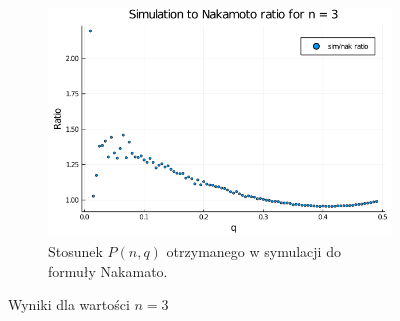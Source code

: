 \documentclass{article}
\begin{document}
\begin{figure}[H]
            \begin{subfigure}{0.65\textwidth}
                \includegraphics[width=\linewidth]{img/mc_to_na_n=3.png}
                \caption{Stosunek $P(n,q)$ otrzymanego w symulacji do formuły Nakamato.}
            \end{subfigure}
    
            \caption{Wyniki dla wartości $n = 3$}
        \end{figure}
\end{document}
